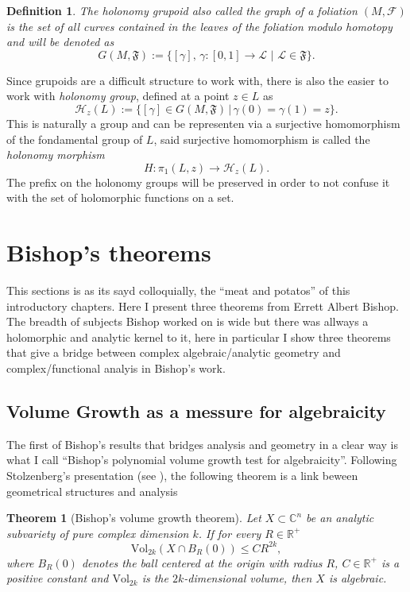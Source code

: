 \documentclass[12pt,twoside,a4paper]{report}
\newtheorem{definition}{Definition}[section]
\newtheorem{theorem}{Theorem}[section]
\newcommand{\re}{\ensuremath{\mathbb R }}
\newcommand{\con}{\ensuremath{\mathbb{C}^n}}
\begin{document}
\begin{definition}
The \emph{holonomy grupoid} also called the \emph{graph} of a foliation $(M,\mathcal{F})$ is the set of all curves contained in the leaves of the foliation \textit{modulo homotopy} and will be denoted as 
\[
G(M,\mathfrak{F}):=\{[\gamma],\,\gamma:[0,1]\rightarrow\mathcal{L}\,\,\vert\,\,\mathcal{L}\in\mathfrak{F}\}.
\]
\end{definition}
Since grupoids are a difficult structure to work with, there is also the easier to work with \emph{holonomy group}, defined at a point $z\in L$ as
\[
\mathcal{H}_z(L):=\{[\gamma]\in G(M,\mathfrak{F})\,|\,\gamma(0)=\gamma(1)=z\}.
\]
This is naturally a group and can be representen via a surjective homomorphism of the fondamental group of $L$, said surjective homomorphism is called the \emph{holonomy morphism}
\[
H:\pi_{1}(L,z)\rightarrow\mathcal{H}_z(L).
\]
The prefix on the holonomy groups will be preserved in order to not confuse it with the set of holomorphic functions on a set.


\section{Bishop's theorems}
\noindent This sections is as its sayd colloquially, the ``meat and potatos'' of this introductory chapters. Here I present three theorems from Errett Albert Bishop. The breadth of subjects Bishop worked on is wide but there was allways a holomorphic and analytic kernel to it, here in particular I show three theorems that give a bridge between complex algebraic/analytic geometry and complex/functional analyis in Bishop's work.  
\subsection{Volume Growth as a messure for algebraicity}

\noindent The first of Bishop's results that bridges analysis and geometry in a clear way is what I call ``Bishop's polynomial volume growth test for algebraicity''. Following Stolzenberg's presentation (see \cite{Stolzenberg}), the following theorem is a link beween geometrical structures and analysis
\begin{theorem}[Bishop's volume growth theorem]\label{Bishop1}
        Let $X\subset\con$ be an analytic subvariety of pure complex dimension $k$. If for every $R\in\re^+$
        \[
          \textrm{Vol}_{2k}(X\cap B_R(0))\leq CR^{2k},
        \]
        where $B_R(0)$ denotes the ball centered at the origin with radius $R$, $C\in\re^{+}$ is a positive constant
        and $\textrm{Vol}_{2k}$ is the $2k$-dimensional volume, then $X$ is algebraic.
\end{theorem}
\end{document}
